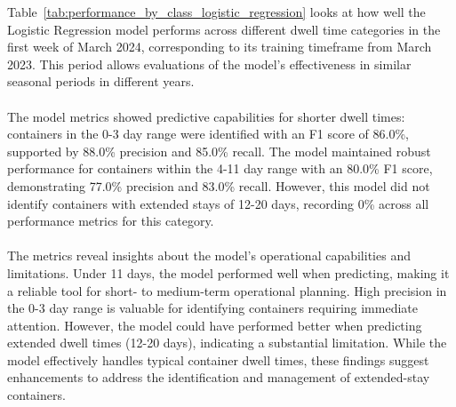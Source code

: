 			Table~\ref{tab:performance_by_class_logistic_regression}
			looks at how well the Logistic Regression model performs across different dwell time categories in the
			first week of March 2024, corresponding to its training timeframe from March 2023. This period allows
			evaluations
			of the model's effectiveness in similar seasonal periods in different years.
			\\
			\\
			The model metrics showed predictive capabilities for shorter dwell times: containers in the 0-3 day range
			were identified with an F1 score of 86.0\%, supported by 88.0\% precision and 85.0\%
			recall. The model maintained robust performance for containers within the 4-11 day range with an 80.0\%
			F1 score, demonstrating 77.0\% precision and 83.0\%
			recall. However, this model did not identify containers with extended stays of 12-20 days,
			recording 0\%
			across all performance metrics for this category.
			\\
			\\
			The metrics reveal insights about the model's operational capabilities and limitations. Under 11 days, the
			model performed well when predicting, making it a reliable tool for short- to medium-term operational
			planning. High precision in the 0-3 day range is valuable for identifying containers requiring immediate
			attention. However, the model could have performed better when predicting extended dwell times (12-20
			days),
			indicating a substantial limitation. While the model effectively handles typical container dwell times,
			these findings suggest enhancements to address the identification and management of extended-stay
			containers.

